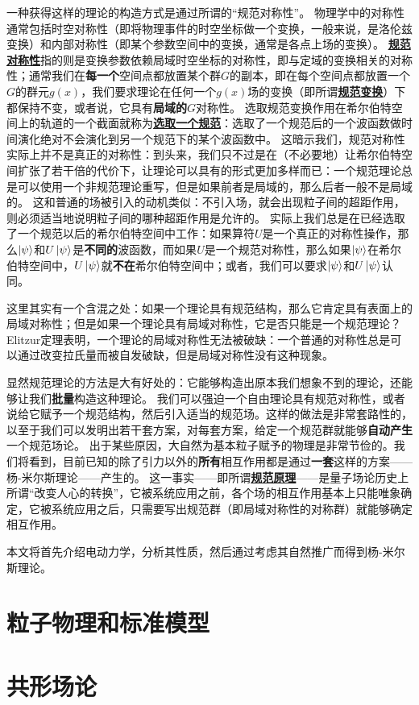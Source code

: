 \documentclass[hyperref, UTF8, a4paper]{ctexbook}
\newcommand{\concept}[1]{\underline{\textbf{#1}}}
\renewcommand{\emph}{\textbf}
\newcommand{\soliddoc}{\href{../solid/solid}{固体物理笔记}}
\begin{document}
一种获得这样的理论的构造方式是通过所谓的“规范对称性”。
物理学中的对称性通常包括时空对称性（即将物理事件的时空坐标做一个变换，一般来说，是洛伦兹变换）和内部对称性（即某个参数空间中的变换，通常是各点上场的变换）。
\concept{规范对称性}指的则是变换参数依赖局域时空坐标的对称性，即与定域的变换相关的对称性；通常我们在\emph{每一个}空间点都放置某个群$G$的副本，即在每个空间点都放置一个$G$的群元$g(x)$，我们要求理论在任何一个$g(x)$场的变换（即所谓\concept{规范变换}）下都保持不变，或者说，它具有\emph{局域的}$G$对称性。
选取规范变换作用在希尔伯特空间上的轨道的一个截面就称为\concept{选取一个规范}：选取了一个规范后的一个波函数做时间演化绝对不会演化到另一个规范下的某个波函数中。
这暗示我们，规范对称性实际上并不是真正的对称性：到头来，我们只不过是在（不必要地）让希尔伯特空间扩张了若干倍的代价下，让理论可以具有的形式更加多样而已：一个规范理论总是可以使用一个非规范理论重写，但是如果前者是局域的，那么后者一般不是局域的。
这和普通的场被引入的动机类似：不引入场，就会出现粒子间的超距作用，则必须适当地说明粒子间的哪种超距作用是允许的。
实际上我们总是在已经选取了一个规范以后的希尔伯特空间中工作：如果算符$U$是一个真正的对称性操作，那么$\ket{\psi}$和$U \ket{\psi}$是\emph{不同的}波函数，而如果$U$是一个规范对称性，那么如果$\ket{\psi}$在希尔伯特空间中，$U \ket{\psi}$就\emph{不在}希尔伯特空间中；或者，我们可以要求$\ket{\psi}$和$U \ket{\psi}$认同。

这里其实有一个含混之处：如果一个理论具有规范结构，那么它肯定具有表面上的局域对称性；但是如果一个理论具有局域对称性，它是否只能是一个规范理论？
Elitzur定理\cite{Elitzur_1975}表明，一个理论的局域对称性无法被破缺：一个普通的对称性总是可以通过改变拉氏量而被自发破缺，但是局域对称性没有这种现象。

显然规范理论的方法是大有好处的：它能够构造出原本我们想象不到的理论，还能够让我们\emph{批量}构造这种理论。
我们可以强迫一个自由理论具有规范对称性，或者说给它赋予一个规范结构，然后引入适当的规范场。这样的做法是非常套路性的，以至于我们可以发明出若干套方案，对每套方案，给定一个规范群就能够\emph{自动产生}一个规范场论。
出于某些原因，大自然为基本粒子赋予的物理是非常节俭的。我们将看到，目前已知的除了引力以外的\emph{所有}相互作用都是通过\emph{一套}这样的方案——杨-米尔斯理论——产生的。
这一事实——即所谓\concept{规范原理}——是量子场论历史上所谓“改变人心的转换”，它被系统应用之前，各个场的相互作用基本上只能唯象确定，它被系统应用之后，只需要写出规范群（即局域对称性的对称群）就能够确定相互作用。

本文将首先介绍电动力学，分析其性质，然后通过考虑其自然推广而得到杨-米尔斯理论。







\part{粒子物理和标准模型}

\part{共形场论}




 
\end{document}
